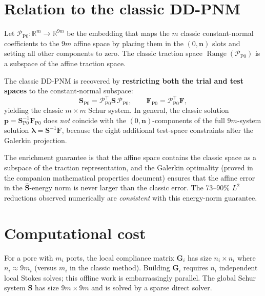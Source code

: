 \documentclass[11pt,a4paper]{article}
\newcommand{\R}{\mathbb{R}}
\newcommand{\normal}{\bm{n}}
\newcommand{\trac}{\bm{\lambda}}
\newcommand{\DtN}{\mathbf{G}}
\newcommand{\Schur}{\mathbf{S}}
\begin{document}
\section{Relation to the classic DD-PNM}
\label{sec:reduction}

Let $\mathcal{P}_{\text{P0}} : \R^m \to \R^{9m}$ be the embedding that
maps the $m$ classic constant-normal coefficients to the $9m$ affine
space by placing them in the $(0,\normal)$ slots and setting all other
components to zero.  The classic traction space
$\operatorname{Range}(\mathcal{P}_{\text{P0}})$ is a subspace of the
affine traction space.

The classic DD-PNM is recovered by \textbf{restricting both the trial
and test spaces} to the constant-normal subspace:
\begin{equation}\label{eq:classic-recovery}
  \Schur_{\text{P0}} = \mathcal{P}_{\text{P0}}^\top \Schur\,
                       \mathcal{P}_{\text{P0}},\qquad
  \bm{F}_{\text{P0}} = \mathcal{P}_{\text{P0}}^\top \bm{F},
\end{equation}
yielding the classic $m\times m$ Schur system.  In general, the classic
solution $\bm{p} = \Schur_{\text{P0}}^{-1}\bm{F}_{\text{P0}}$ does
\emph{not} coincide with the $(0,\normal)$-components of the full
$9m$-system solution $\trac = \Schur^{-1}\bm{F}$, because the eight
additional test-space constraints alter the Galerkin projection.

The enrichment guarantee is that the affine space contains the classic
space as a subspace of the traction representation, and the Galerkin
optimality (proved in the companion mathematical properties document)
ensures that the affine error in the $\widehat{\Schur}$-energy norm is
never larger than the classic error.  The 73--90\% $L^2$ reductions
observed numerically are \emph{consistent} with this energy-norm
guarantee.

\section{Computational cost}

For a pore with $m_i$ ports, the local compliance matrix $\DtN_i$ has
size $n_i \times n_i$ where $n_i \approx 9m_i$ (versus $m_i$ in the
classic method).  Building $\DtN_i$ requires $n_i$ independent local
Stokes solves; this offline work is embarrassingly parallel.
The global Schur system $\Schur$ has size $9m \times 9m$ and is solved
by a sparse direct solver.
\end{document}

